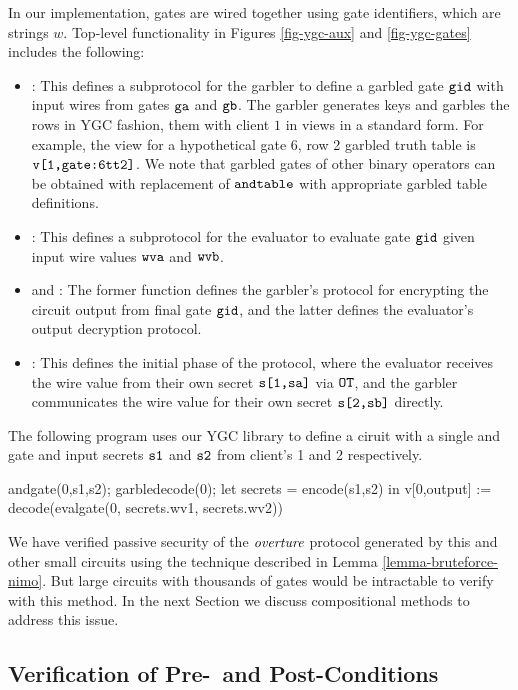In our implementation, gates are wired together using gate
identifiers, which are strings $w$. Top-level functionality in Figures
\ref{fig-ygc-aux} and \ref{fig-ygc-gates} includes the following:
\begin{itemize}
\item {}: This defines a subprotocol for the garbler
  to define a garbled gate $\texttt{gid}$ with input wires from gates
  $\texttt{ga}$ and $\texttt{gb}$. The garbler generates keys and garbles
  the rows in YGC fashion, them with client $1$ in
  views in a standard form. For example, the view for
  a hypothetical gate 6, row 2 garbled truth table is $\texttt{v[1,gate:6tt2]}$.
  We note that garbled gates of other binary operators can be obtained with
  replacement of $\texttt{andtable}$ with appropriate garbled table definitions. 
\item {}: This defines a subprotocol for the evaluator to
  evaluate gate $\texttt{gid}$ given input wire values $\texttt{wva}$ and
  $\texttt{wvb}$.
\item {} and : The former function
  defines the garbler's protocol for encrypting the circuit
  output from final gate $\texttt{gid}$, and the latter defines
  the evaluator's output decryption protocol.
\item {}: This defines the initial phase of the protocol,
  where the evaluator receives the wire value from their own
  secret $\texttt{s[1,sa]}$ via $\texttt{OT}$, and the garbler communicates
  the wire value for their own secret $\texttt{s[2,sb]}$ directly.
\end{itemize}
\begin{example}
  \label{example-andcircuit}
The following program uses our YGC library to define
a ciruit with a single and gate and input secrets $\texttt{s1}$ and
$\texttt{s2}$ from client's 1 and 2 respectively. 
\begin{verbatimtab}
  andgate(0,s1,s2);
  garbledecode(0);
  let secrets = encode(s1,s2) in
  v[0,output] := decode(evalgate(0, secrets.wv1, secrets.wv2))
\end{verbatimtab}
\end{example}
We have verified passive security of the $\mathit{overture}$ protocol
generated by this and other small circuits using the
technique described in Lemma \ref{lemma-bruteforce-nimo}.
But large circuits with thousands of gates would be
intractable to verify with this method. In the next Section
we discuss compositional methods to address this issue.

\subsection{Verification of Pre-~and Post-Conditions}

